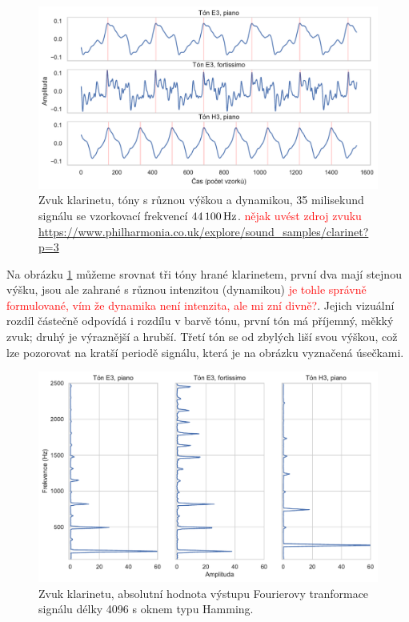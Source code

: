 \begin{figure}[h]\centering
\includegraphics[width=\textwidth,height=\textheight,keepaspectratio]{../img/audio_clarinet}
\caption{Zvuk klarinetu, tóny s různou výškou a dynamikou, 35 milisekund signálu se vzorkovací frekvencí $44\,100\,\rm Hz$. \textcolor{red}{nějak uvést zdroj zvuku \url{https://www.philharmonia.co.uk/explore/sound_samples/clarinet?p=3}}}
\label{obr:audio_clarinet}
\end{figure}

Na obrázku \ref{obr:audio_clarinet} můžeme srovnat tři tóny hrané klarinetem, první dva mají stejnou výšku, jsou ale zahrané s různou intenzitou (dynamikou) \textcolor{red}{je tohle správně formulované, vím že dynamika není intenzita, ale  mi zní divně?}. Jejich vizuální rozdíl částečně odpovídá i rozdílu v barvě tónu, první tón má příjemný, měkký zvuk; druhý je výraznější a hrubší. Třetí tón se od zbylých liší svou výškou, což lze pozorovat na kratší periodě signálu, která je na obrázku vyznačená úsečkami. 

\begin{figure}[h]\centering
\includegraphics[width=\textwidth,height=\textheight,keepaspectratio]{../img/audio_clarinet_dft}
\caption{Zvuk klarinetu, absolutní hodnota výstupu Fourierovy tranformace signálu délky 4096 s oknem typu Hamming.}
\label{obr:audio_clarinet_dft}
\end{figure}

